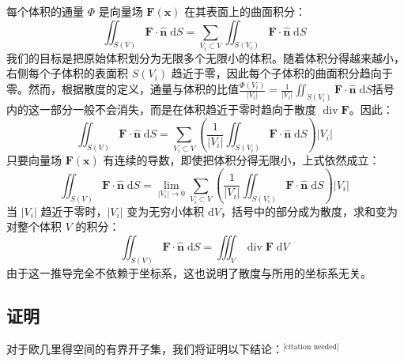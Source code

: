 每个体积的通量 $\Phi$ 是向量场 $\mathbf{F}(\mathbf{x})$ 在其表面上的曲面积分：
$$
\iint_{S(V)} \mathbf{F} \cdot \mathbf{\hat{n}} \;\mathrm{d} S
= 
\sum_{V_i \subset V} 
\iint_{S(V_i)} \mathbf{F} \cdot \mathbf{\hat{n}} \;\mathrm{d} S~
$$
我们的目标是把原始体积划分为无限多个无限小的体积。随着体积分得越来越小，右侧每个子体积的表面积 $S(V_i)$ 趋近于零，因此每个子体积的曲面积分趋向于零。然而，根据散度的定义，通量与体积的比值$\frac{\Phi(V_i)}{|V_i|}= \frac{1}{|V_i|}\iint_{S(V_i)} \mathbf{F} \cdot \mathbf{\hat{n}} \;\mathrm{d} S$括号内的这一部分一般不会消失，而是在体积趋近于零时趋向于散度 $\operatorname{div} \mathbf{F}$。因此：
$$
\iint_{S(V)} \mathbf{F} \cdot \mathbf{\hat{n}} \;\mathrm{d} S
=
\sum_{V_i \subset V}
\left(
\frac{1}{|V_i|}
\iint_{S(V_i)} \mathbf{F} \cdot \mathbf{\hat{n}} \;\mathrm{d} S
\right)
|V_i|~
$$
只要向量场 $\mathbf{F}(\mathbf{x})$ 有连续的导数，即使把体积分得无限小，上式依然成立：
$$
\iint_{S(V)} \mathbf{F} \cdot \mathbf{\hat{n}} \;\mathrm{d} S
=
\lim_{|V_i|\to 0}
\sum_{V_i \subset V}
\left(
\frac{1}{|V_i|}
\iint_{S(V_i)} \mathbf{F} \cdot \mathbf{\hat{n}} \;\mathrm{d} S
\right)
|V_i|~
$$
当 $|V_i|$ 趋近于零时，$|V_i|$ 变为无穷小体积 $\mathrm{d}V$，括号中的部分成为散度，求和变为对整个体积 $V$ 的积分：
$$
\iint_{S(V)} \mathbf{F} \cdot \mathbf{\hat{n}} \;\mathrm{d} S
=
\iiint_{V} \operatorname{div} \mathbf{F} \;\mathrm{d} V~
$$
由于这一推导完全不依赖于坐标系，这也说明了散度与所用的坐标系无关。
\subsection{证明}
对于欧几里得空间的有界开子集，我们将证明以下结论：\(^\text{[citation needed]}\)

